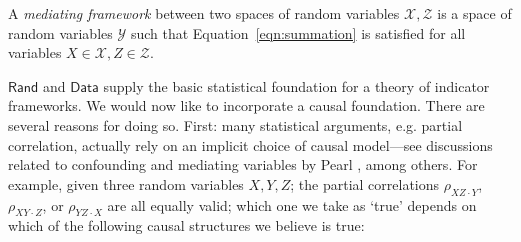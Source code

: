 \documentclass[sigconf]{acmart}
\newcommand{\redout}[1]{{\color{red}#1}}
\newcommand{\Cat}[1]{\mathsf{#1}}
\def\Rand{\Cat{Rand}}
\def\Data{\Cat{Data}}
\begin{document}
\begin{definition}
A \emph{mediating framework} between two spaces of random variables $\mathcal{X}, \mathcal{Z}$ is a space of random variables $\mathcal{Y}$ such that Equation~\ref{eqn:summation} is satisfied for all variables $X \in \mathcal{X}, Z \in \mathcal{Z}$.
\end{definition}



$\Rand$ and $\Data$ supply the basic statistical foundation for a theory of indicator frameworks. We would now like to incorporate a causal foundation. There are several reasons for doing so. First: many statistical arguments, e.g. partial correlation, actually rely on an implicit choice of causal model---see discussions related to confounding and mediating variables by Pearl \cite{pearl09}, among others. For example, given three random variables $X, Y, Z$; the partial correlations $\rho_{XZ \cdot Y}$, $\rho_{XY \cdot Z}$, or $\rho_{YZ \cdot X}$ are all equally valid; which one we take as `true' depends on which of the following causal structures we believe is true:
\end{document}
